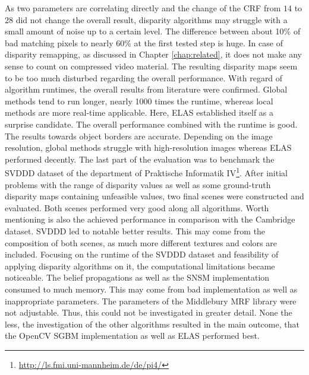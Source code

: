 As two parameters are correlating directly and the change of the CRF from $14$ to $28$ did not change the overall result, disparity algorithms may struggle with a small amount of noise up to a certain level.
The difference between about 10\% of bad matching pixels to nearly 60\% at the first tested step is huge.
In case of disparity remapping, as discussed in Chapter \ref{chap:related}, it does not make any sense to count on compressed video material.
The resulting disparity maps seem to be too much disturbed regarding the overall performance.
\newline\newline\noindent With regard of algorithm runtimes, the overall results from literature were confirmed.
Global methods tend to run longer, nearly 1000 times the runtime, whereas local methods are more real-time applicable.
Here, ELAS established itself as a surprise candidate.
The overall performance combined with the runtime is good.
The results towards object borders are accurate.
Depending on the image resolution, global methods struggle with high-resolution images whereas ELAS performed decently.
\newline\newline\noindent The last part of the evaluation was to benchmark the SVDDD dataset of the department of Praktische Informatik IV\footnote{\url{http://ls.fmi.uni-mannheim.de/de/pi4/}}.
After initial problems with the range of disparity values as well as some ground-truth disparity maps containing unfeasible values, two final scenes were constructed and evaluated.
Both scenes performed very good along all algorithms.
Worth mentioning is also the achieved performance in comparison with the Cambridge dataset.
SVDDD led to notable better results.
This may come from the composition of both scenes, as much more different textures and colors are included.
Focusing on the runtime of the SVDDD dataset and feasibility of applying disparity algorithms on it, the computational limitations became noticeable.
The belief propagations as well as the SNSM implementation consumed to much memory.
This may come from bad implementation as well as inappropriate parameters.
The parameters of the Middlebury MRF library were not adjustable.
Thus, this could not be investigated in greater detail.
None the less, the investigation of the other algorithms resulted in the main outcome, that the OpenCV SGBM implementation as well as ELAS performed best.
